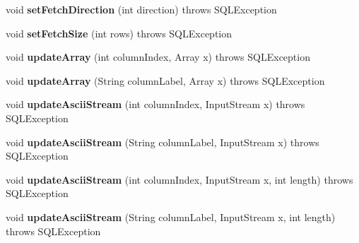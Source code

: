 \begin{DoxyCompactItemize}
void {\bfseries set\+Fetch\+Direction} (int direction)  throws S\+Q\+L\+Exception 
\item 
\mbox{\label{classsimpledb_1_1jdbc_1_1ResultSetAdapter_ad543885f3407abdb245de346c4f14733}} 
void {\bfseries set\+Fetch\+Size} (int rows)  throws S\+Q\+L\+Exception 
\item 
\mbox{\label{classsimpledb_1_1jdbc_1_1ResultSetAdapter_a252989e865df944a3170dea00aeb57b9}} 
void {\bfseries update\+Array} (int column\+Index, Array x)  throws S\+Q\+L\+Exception 
\item 
\mbox{\label{classsimpledb_1_1jdbc_1_1ResultSetAdapter_a74a1127249a8ceda3427a209ac5e6120}} 
void {\bfseries update\+Array} (String column\+Label, Array x)  throws S\+Q\+L\+Exception 
\item 
\mbox{\label{classsimpledb_1_1jdbc_1_1ResultSetAdapter_a7c4d5d53c7b74d2ce17bced2c042d2f5}} 
void {\bfseries update\+Ascii\+Stream} (int column\+Index, Input\+Stream x)  throws S\+Q\+L\+Exception 
\item 
\mbox{\label{classsimpledb_1_1jdbc_1_1ResultSetAdapter_a9b3aeaf4ccd7b120848323c1b23fd6d1}} 
void {\bfseries update\+Ascii\+Stream} (String column\+Label, Input\+Stream x)  throws S\+Q\+L\+Exception 
\item 
\mbox{\label{classsimpledb_1_1jdbc_1_1ResultSetAdapter_a3d7119b33e77c772f06a3bc677d6571c}} 
void {\bfseries update\+Ascii\+Stream} (int column\+Index, Input\+Stream x, int length)  throws S\+Q\+L\+Exception 
\item 
\mbox{\label{classsimpledb_1_1jdbc_1_1ResultSetAdapter_ade354b743d4d680cb8c55ef9a477cdc8}} 
void {\bfseries update\+Ascii\+Stream} (String column\+Label, Input\+Stream x, int length)  throws S\+Q\+L\+Exception 
\item 
\mbox{\label{classsimpledb_1_1jdbc_1_1ResultSetAdapter_a372657446a897c7f6f628512f23c51c7}} 

\end{DoxyCompactItemize}
